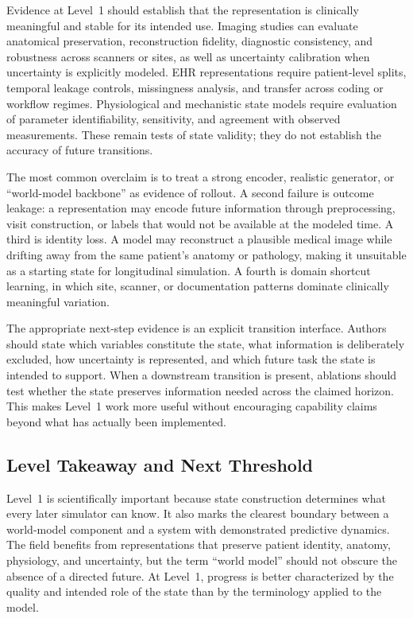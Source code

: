 Evidence at Level~1 should establish that the representation is clinically meaningful and stable for its intended use. Imaging studies can evaluate anatomical preservation, reconstruction fidelity, diagnostic consistency, and robustness across scanners or sites, as well as uncertainty calibration when uncertainty is explicitly modeled. EHR representations require patient-level splits, temporal leakage controls, missingness analysis, and transfer across coding or workflow regimes. Physiological and mechanistic state models require evaluation of parameter identifiability, sensitivity, and agreement with observed measurements. These remain tests of state validity; they do not establish the accuracy of future transitions.

The most common overclaim is to treat a strong encoder, realistic generator, or ``world-model backbone'' as evidence of rollout. A second failure is outcome leakage: a representation may encode future information through preprocessing, visit construction, or labels that would not be available at the modeled time. A third is identity loss. A model may reconstruct a plausible medical image while drifting away from the same patient's anatomy or pathology, making it unsuitable as a starting state for longitudinal simulation. A fourth is domain shortcut learning, in which site, scanner, or documentation patterns dominate clinically meaningful variation.

The appropriate next-step evidence is an explicit transition interface. Authors should state which variables constitute the state, what information is deliberately excluded, how uncertainty is represented, and which future task the state is intended to support. When a downstream transition is present, ablations should test whether the state preserves information needed across the claimed horizon. This makes Level~1 work more useful without encouraging capability claims beyond what has actually been implemented.

\subsection{Level Takeaway and Next Threshold}

Level~1 is scientifically important because state construction determines what every later simulator can know. It also marks the clearest boundary between a world-model component and a system with demonstrated predictive dynamics. The field benefits from representations that preserve patient identity, anatomy, physiology, and uncertainty, but the term ``world model'' should not obscure the absence of a directed future. At Level~1, progress is better characterized by the quality and intended role of the state than by the terminology applied to the model.


